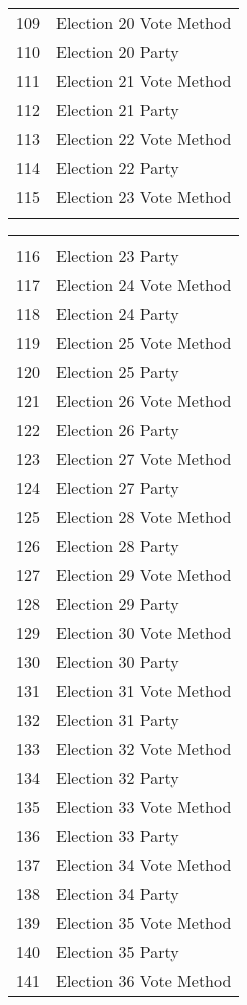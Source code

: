 \begin{table}[!htbp]
\begin{tabular}{@{\extracolsep{5pt}} cl}
109 & Election 20 Vote Method \\ 
110 & Election 20 Party \\ 
111 & Election 21 Vote Method \\ 
112 & Election 21 Party \\ 
113 & Election 22 Vote Method \\ 
114 & Election 22 Party \\ 
115 & Election 23 Vote Method \\   
\hline \\[-1.8ex] 
\end{tabular}
\begin{tabular}{@{\extracolsep{5pt}} cl}
\\[-1.8ex]\hline 
\hline \\[-1.8ex] 
116 & Election 23 Party \\ 
117 & Election 24 Vote Method \\ 
118 & Election 24 Party \\ 
119 & Election 25 Vote Method \\ 
120 & Election 25 Party \\ 
121 & Election 26 Vote Method \\ 
122 & Election 26 Party \\ 
123 & Election 27 Vote Method \\ 
124 & Election 27 Party \\ 
125 & Election 28 Vote Method \\ 
126 & Election 28 Party \\ 
127 & Election 29 Vote Method \\ 
128 & Election 29 Party \\ 
129 & Election 30 Vote Method \\ 
130 & Election 30 Party \\ 
131 & Election 31 Vote Method \\ 
132 & Election 31 Party \\ 
133 & Election 32 Vote Method \\ 
134 & Election 32 Party \\ 
135 & Election 33 Vote Method \\ 
136 & Election 33 Party \\ 
137 & Election 34 Vote Method \\ 
138 & Election 34 Party \\ 
139 & Election 35 Vote Method \\ 
140 & Election 35 Party \\ 
141 & Election 36 Vote Method \\ 

\end{tabular}
\end{table}
